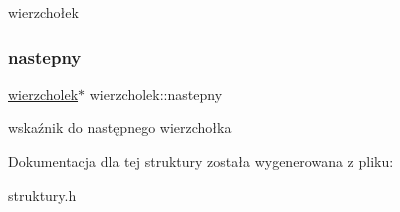 wierzchołek \mbox{\label{structwierzcholek_afc6e289ba34df6780a3b73f8f189a878}} 
\subsubsection{\texorpdfstring{nastepny}{nastepny}}
{\footnotesize\ttfamily \hyperlink{structwierzcholek}{wierzcholek}$\ast$ wierzcholek\+::nastepny}

wskaźnik do następnego wierzchołka 

Dokumentacja dla tej struktury została wygenerowana z pliku\+:\begin{DoxyCompactItemize}
\item 
struktury.\+h\end{DoxyCompactItemize}
